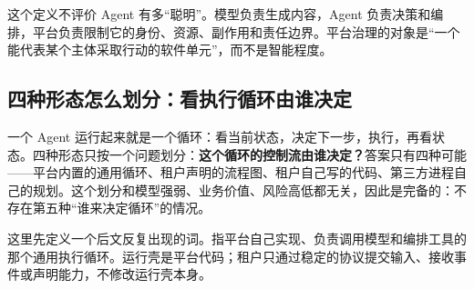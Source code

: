 这个定义不评价 Agent 有多“聪明”。模型负责生成内容，Agent 负责决策和编排，平台负责限制它的身份、资源、副作用和责任边界。平台治理的对象是“一个能代表某个主体采取行动的软件单元”，而不是智能程度。

\subsection{四种形态怎么划分：看执行循环由谁决定}

一个 Agent 运行起来就是一个循环：看当前状态，决定下一步，执行，再看状态。四种形态只按一个问题划分：\textbf{这个循环的控制流由谁决定？}答案只有四种可能——平台内置的通用循环、租户声明的流程图、租户自己写的代码、第三方进程自己的规划。这个划分和模型强弱、业务价值、风险高低都无关，因此是完备的：不存在第五种“谁来决定循环”的情况。

这里先定义一个后文反复出现的词。指平台自己实现、负责调用模型和编排工具的那个通用执行循环。运行壳是平台代码；租户只通过稳定的协议提交输入、接收事件或声明能力，不修改运行壳本身。

